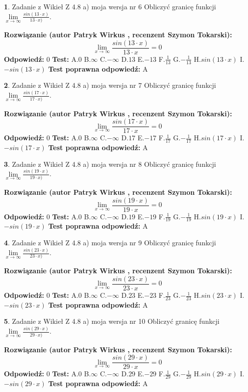 \documentclass[12pt, a4paper]{article}
\theoremstyle{definition} %
\newtheorem{zad}{}
\newcommand{\zadStart}[1]{\begin{zad}#1\newline}
\newcommand{\zadStop}{\end{zad}}
\newcommand{\rozwStart}[2]{\noindent \textbf{Rozwiązanie (autor #1 , recenzent #2): }\newline}
\newcommand{\rozwStop}{\newline}
\newcommand{\odpStart}{\noindent \textbf{Odpowiedź:}\newline}
\newcommand{\odpStop}{\newline}
\newcommand{\testStart}{\noindent \textbf{Test:}\newline}
\newcommand{\testStop}{\newline}
\newcommand{\kluczStart}{\noindent \textbf{Test poprawna odpowiedź:}\newline}
\newcommand{\kluczStop}{\newline}
\begin{document}
\zadStart{Zadanie z Wikieł Z 4.8 a) moja wersja nr 6}
Obliczyć granicę funkcji $\lim\limits_{x\to \infty}\frac{sin(13\cdot x)}{13\cdot x)}$.
\zadStop
\rozwStart{Patryk Wirkus}{Szymon Tokarski}
$$\lim\limits_{x\to \infty}\frac{sin(13\cdot x)}{13\cdot x}=
0$$
\rozwStop
\odpStart
$0$
\odpStop
\testStart
A.$0$ B.$\infty$ C.$-\infty$ D.$13$ E.$-13$
F.$\frac{1}{13}$ G.$-\frac{1}{13}$
H.$sin(13\cdot x)$
I.$-sin(13\cdot x)$
\testStop
\kluczStart
A
\kluczStop



\zadStart{Zadanie z Wikieł Z 4.8 a) moja wersja nr 7}
Obliczyć granicę funkcji $\lim\limits_{x\to \infty}\frac{sin(17\cdot x)}{17\cdot x)}$.
\zadStop
\rozwStart{Patryk Wirkus}{Szymon Tokarski}
$$\lim\limits_{x\to \infty}\frac{sin(17\cdot x)}{17\cdot x}=
0$$
\rozwStop
\odpStart
$0$
\odpStop
\testStart
A.$0$ B.$\infty$ C.$-\infty$ D.$17$ E.$-17$
F.$\frac{1}{17}$ G.$-\frac{1}{17}$
H.$sin(17\cdot x)$
I.$-sin(17\cdot x)$
\testStop
\kluczStart
A
\kluczStop



\zadStart{Zadanie z Wikieł Z 4.8 a) moja wersja nr 8}
Obliczyć granicę funkcji $\lim\limits_{x\to \infty}\frac{sin(19\cdot x)}{19\cdot x)}$.
\zadStop
\rozwStart{Patryk Wirkus}{Szymon Tokarski}
$$\lim\limits_{x\to \infty}\frac{sin(19\cdot x)}{19\cdot x}=
0$$
\rozwStop
\odpStart
$0$
\odpStop
\testStart
A.$0$ B.$\infty$ C.$-\infty$ D.$19$ E.$-19$
F.$\frac{1}{19}$ G.$-\frac{1}{19}$
H.$sin(19\cdot x)$
I.$-sin(19\cdot x)$
\testStop
\kluczStart
A
\kluczStop



\zadStart{Zadanie z Wikieł Z 4.8 a) moja wersja nr 9}
Obliczyć granicę funkcji $\lim\limits_{x\to \infty}\frac{sin(23\cdot x)}{23\cdot x)}$.
\zadStop
\rozwStart{Patryk Wirkus}{Szymon Tokarski}
$$\lim\limits_{x\to \infty}\frac{sin(23\cdot x)}{23\cdot x}=
0$$
\rozwStop
\odpStart
$0$
\odpStop
\testStart
A.$0$ B.$\infty$ C.$-\infty$ D.$23$ E.$-23$
F.$\frac{1}{23}$ G.$-\frac{1}{23}$
H.$sin(23\cdot x)$
I.$-sin(23\cdot x)$
\testStop
\kluczStart
A
\kluczStop



\zadStart{Zadanie z Wikieł Z 4.8 a) moja wersja nr 10}
Obliczyć granicę funkcji $\lim\limits_{x\to \infty}\frac{sin(29\cdot x)}{29\cdot x)}$.
\zadStop
\rozwStart{Patryk Wirkus}{Szymon Tokarski}
$$\lim\limits_{x\to \infty}\frac{sin(29\cdot x)}{29\cdot x}=
0$$
\rozwStop
\odpStart
$0$
\odpStop
\testStart
A.$0$ B.$\infty$ C.$-\infty$ D.$29$ E.$-29$
F.$\frac{1}{29}$ G.$-\frac{1}{29}$
H.$sin(29\cdot x)$
I.$-sin(29\cdot x)$
\testStop
\kluczStart
A
\kluczStop
\end{document}
